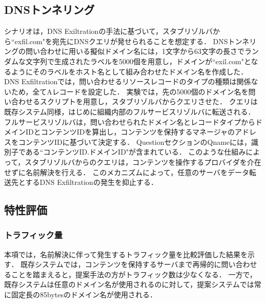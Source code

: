\subsection{DNSトンネリング}
\label{sec:eval-tunnel}
シナリオは，DNS Exiltrationの手法に基づいて，スタブリゾルバから``exfil.com"を宛先にDNSクエリが発せられることを想定する．
DNSトンネリングの問い合わせに用いる擬似ドメイン名には，1文字から63文字の長さでランダムな文字列で生成されたラベルを5000個を用意し，ドメインが``exil.com"となるようにそのラベルをホスト名として組み合わせたドメイン名を作成した．
DNS Exfiltrationでは，問い合わせるリソースレコードのタイプの種類は関係ないため，全てAレコードを設定した．
実験では，先の5000個のドメイン名を問い合わせるスクリプトを用意し，スタブリゾルバからクエリさせた．
クエリは既存システム同様，はじめに組織内部のフルサービスリゾルバに転送される．
フルサービスリゾルバは，問い合わせられたドメイン名とレコードタイプからドメインIDとコンテンツIDを算出し，コンテンツを保持するマネージャのアドレスをコンテンツIDに基づいて決定する．
QuestionセクションのQnameには，識別子である``コンテンツID.ドメインID"が含まれている．
このような仕組みによって，スタブリゾルバからのクエリは，コンテンツを操作するプロバイダを介在せずに名前解決を行える．
このメカニズムによって，任意のサーバをデータ転送先とするDNS Exfiltrationの発生を抑止する．
\subsection{特性評価}
\subsubsection{トラフィック量}
本項では，名前解決に伴って発生するトラフィック量を比較評価した結果を示す．
既存システムでは，コンテンツを保持するサーバまで再帰的に問い合わせることを踏まえると，提案手法の方がトラフィック数は少なくなる．
一方で，既存システムは任意のドメイン名が使用されるのに対して，提案システムでは常に固定長の85bytesのドメイン名が使用される．

